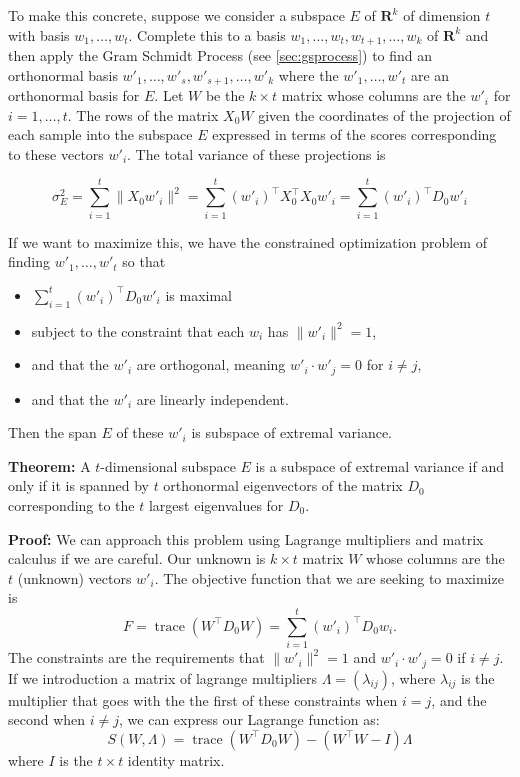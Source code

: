 \documentclass[
  oneside]{scrbook}
\providecommand{\tightlist}{%
  \setlength{\itemsep}{0pt}\setlength{\parskip}{0pt}}
\begin{document}
To make this concrete, suppose we consider a subspace \(E\) of
\(\mathbf{R}^{k}\) of dimension \(t\) with basis
\(w_{1},\ldots, w_{t}\). Complete this to a basis
\(w_{1},\ldots, w_{t},w_{t+1},\ldots, w_{k}\) of \(\mathbf{R}^{k}\) and
then apply the Gram Schmidt Process (see \cref{sec:gsprocess}) to find
an orthonormal basis \(w'_{1},\ldots,w'_{s},w'_{s+1},\ldots, w'_{k}\)
where the \(w'_{1},\ldots, w'_{t}\) are an orthonormal basis for \(E\).
Let \(W\) be the \(k\times t\) matrix whose columns are the \(w'_{i}\)
for \(i=1,\ldots,t\). The rows of the matrix \(X_{0}W\) given the
coordinates of the projection of each sample into the subspace \(E\)
expressed in terms of the scores corresponding to these vectors
\(w'_{i}\). The total variance of these projections is

\[
\sigma_{E}^2 = \sum_{i=1}^{t} \|X_{0}w'_{i}\|^2 = \sum_{i=1}^{t} (w'_{i})^{\intercal}X_{0}^{\intercal}X_{0}w'_{i}  = \sum_{i=1}^{t} (w'_{i})^{\intercal}D_{0}w'_{i}
\]

If we want to maximize this, we have the constrained optimization
problem of finding \(w'_{1},\ldots, w'_{t}\) so that

\begin{itemize}
\tightlist
\item
  \(\sum_{i=1}^{t} (w'_{i})^{\intercal}D_{0}w'_{i}\) is maximal
\item
  subject to the constraint that each \(w_{i}\) has \(\|w'_{i}\|^2=1\),
\item
  and that the \(w'_{i}\) are orthogonal, meaning
  \(w'_{i}\cdot w'_{j}=0\) for \(i\not=j\),
\item
  and that the \(w'_{i}\) are linearly independent.
\end{itemize}

Then the span \(E\) of these \(w'_{i}\) is subspace of extremal
variance.

\textbf{Theorem:} A \(t\)-dimensional subspace \(E\) is a subspace of
extremal variance if and only if it is spanned by \(t\) orthonormal
eigenvectors of the matrix \(D_{0}\) corresponding to the \(t\) largest
eigenvalues for \(D_{0}\).

\textbf{Proof:} We can approach this problem using Lagrange multipliers
and matrix calculus if we are careful. Our unknown is \(k\times t\)
matrix \(W\) whose columns are the \(t\) (unknown) vectors \(w'_{i}\).
The objective function that we are seeking to maximize is \[
F = \mathop{trace}(W^{\intercal}D_{0}W) = \sum_{i=1}^{t} (w'_{i})^{\intercal}D_{0}w_{i}.
\] The constraints are the requirements that \(\|w'_{i}\|^2=1\) and
\(w'_{i}\cdot w'_{j}=0\) if \(i\not=j\). If we introduction a matrix of
lagrange multipliers \(\Lambda=(\lambda_{ij})\), where \(\lambda_{ij}\)
is the multiplier that goes with the the first of these constraints when
\(i=j\), and the second when \(i\not=j\), we can express our Lagrange
function as: \[
S(W,\Lambda) = \mathop{trace}(W^{\intercal}D_{0}W) - (W^{\intercal}W-I)\Lambda
\] where \(I\) is the \(t\times t\) identity matrix.
\end{document}
